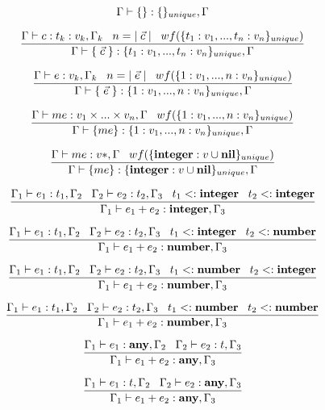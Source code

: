 \[
\Gamma \vdash \{\}:\{\}_{unique}, \Gamma
\]

\[
\dfrac{\Gamma \vdash c:t_{k}:v_{k}, \Gamma_{k} \;\;\;
       n = |\;\vec{c}\;| \;\;\;
       wf(\{t_{1}:v_{1}, ..., t_{n}:v_{n}\}_{unique})}
      {\Gamma \vdash \{\;\vec{c}\;\}:\{t_{1}:v_{1}, ..., t_{n}:v_{n}\}_{unique}, \Gamma}
\]

\[
\dfrac{\Gamma \vdash e:v_{k}, \Gamma_{k} \;\;\;
       n = |\;\vec{e}\;| \;\;\;
       wf(\{1:v_{1}, ..., n:v_{n}\}_{unique})}
      {\Gamma \vdash \{\;\vec{e}\;\}:\{1:v_{1}, ..., n:v_{n}\}_{unique}, \Gamma}
\]

\[
\dfrac{\Gamma \vdash me:v_{1} \times ... \times v_{n}, \Gamma \;\;\;
       wf(\{1:v_{1}, ..., n:v_{n}\}_{unique})}
      {\Gamma \vdash \{me\}:\{1:v_{1}, ..., n:v_{n}\}_{unique}, \Gamma}
\]

\[
\dfrac{\Gamma \vdash me:v{*}, \Gamma \;\;\;
       wf(\{\mathbf{integer}:v \cup \mathbf{nil}\}_{unique})}
      {\Gamma \vdash \{me\}:\{\mathbf{integer}:v \cup \mathbf{nil}\}_{unique}, \Gamma}
\]

\[
\dfrac{\Gamma_{1} \vdash e_{1}:t_{1}, \Gamma_{2} \;\;\;
       \Gamma_{2} \vdash e_{2}:t_{2}, \Gamma_{3} \;\;\;
       t_{1} <: \mathbf{integer} \;\;\;
       t_{2} <: \mathbf{integer}}
      {\Gamma_{1} \vdash e_{1} + e_{2}:\mathbf{integer}, \Gamma_{3}}
\]

\[
\dfrac{\Gamma_{1} \vdash e_{1}:t_{1}, \Gamma_{2} \;\;\;
       \Gamma_{2} \vdash e_{2}:t_{2}, \Gamma_{3} \;\;\;
       t_{1} <: \mathbf{integer} \;\;\;
       t_{2} <: \mathbf{number}}
      {\Gamma_{1} \vdash e_{1} + e_{2}:\mathbf{number}, \Gamma_{3}}
\]

\[
\dfrac{\Gamma_{1} \vdash e_{1}:t_{1}, \Gamma_{2} \;\;\;
       \Gamma_{2} \vdash e_{2}:t_{2}, \Gamma_{3} \;\;\;
       t_{1} <: \mathbf{number} \;\;\;
       t_{2} <: \mathbf{integer}}
      {\Gamma_{1} \vdash e_{1} + e_{2}:\mathbf{number}, \Gamma_{3}}
\]

\[
\dfrac{\Gamma_{1} \vdash e_{1}:t_{1}, \Gamma_{2} \;\;\;
       \Gamma_{2} \vdash e_{2}:t_{2}, \Gamma_{3} \;\;\;
       t_{1} <: \mathbf{number} \;\;\;
       t_{2} <: \mathbf{number}}
      {\Gamma_{1} \vdash e_{1} + e_{2}:\mathbf{number}, \Gamma_{3}}
\]

\[
\dfrac{\Gamma_{1} \vdash e_{1}:\mathbf{any}, \Gamma_{2} \;\;\;
       \Gamma_{2} \vdash e_{2}:t, \Gamma_{3}}
      {\Gamma_{1} \vdash e_{1} + e_{2}:\mathbf{any}, \Gamma_{3}}
\]

\[
\dfrac{\Gamma_{1} \vdash e_{1}:t, \Gamma_{2} \;\;\;
       \Gamma_{2} \vdash e_{2}:\mathbf{any}, \Gamma_{3}}
      {\Gamma_{1} \vdash e_{1} + e_{2}:\mathbf{any}, \Gamma_{3}}
\]

